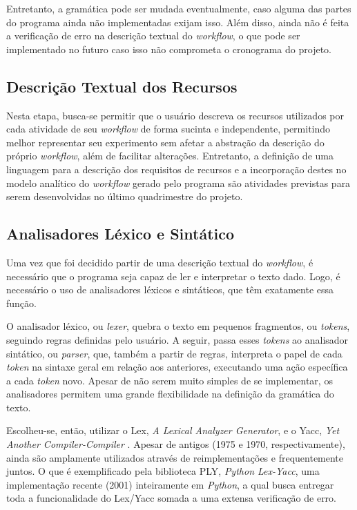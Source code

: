 \documentclass[a4paper,11pt]{article}
\begin{document}
  		Entretanto, a gramática pode ser mudada eventualmente, caso alguma das partes do programa ainda não implementadas exijam isso. Além disso, ainda não é feita a verificação de erro na descrição textual do \emph{workflow}, o que pode ser implementado no futuro caso isso não comprometa o cronograma do projeto.

  	\subsection{Descrição Textual dos Recursos}
  		Nesta etapa, busca-se permitir que o usuário descreva os recursos utilizados por cada atividade de seu \emph{workflow} de forma sucinta e independente, permitindo melhor representar seu experimento sem afetar a abstração da descrição do próprio \emph{workflow}, além de facilitar alterações. Entretanto, a definição de uma linguagem para a descrição dos requisitos de recursos e a incorporação destes no modelo analítico do \emph{workflow} gerado pelo programa são atividades previstas para serem desenvolvidas no último quadrimestre do projeto.

  	\newpage	
  	\subsection{Analisadores Léxico e Sintático}
  		Uma vez que foi decidido partir de uma descrição textual do \emph{workflow}, é necessário que o programa seja capaz de ler e interpretar o texto dado. Logo, é necessário o uso de analisadores léxicos e sintáticos, que têm exatamente essa função.

  		O analisador léxico, ou \emph{lexer}, quebra o texto em pequenos fragmentos, ou \emph{tokens}, seguindo regras definidas pelo usuário. A seguir, passa esses \emph{tokens} ao analisador sintático, ou \emph{parser}, que, também a partir de regras, interpreta o papel de cada \emph{token} na sintaxe geral em relação aos anteriores, executando uma ação específica a cada \emph{token} novo. Apesar de não serem muito simples de se implementar, os analisadores permitem uma grande flexibilidade na definição da gramática do texto.

  		Escolheu-se, então, utilizar o Lex, \emph{A Lexical Analyzer Generator}, e o Yacc, \emph{Yet Another Compiler-Compiler} \cite{web:lexyacc}. Apesar de antigos (1975 e 1970, respectivamente), ainda são amplamente utilizados através de reimplementações e frequentemente juntos. O que é exemplificado pela biblioteca PLY, \emph{Python Lex-Yacc}, uma implementação recente (2001) inteiramente em \emph{Python}, a qual busca entregar toda a funcionalidade do Lex/Yacc somada a uma extensa verificação de erro.
\end{document}
